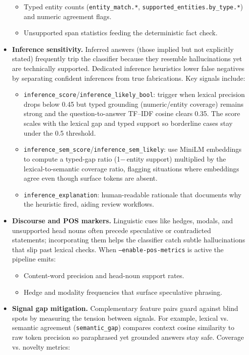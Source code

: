 \documentclass[11pt]{article}
\begin{document}
\begin{itemize}
    \begin{itemize}
      \item Typed entity counts (\texttt{entity\_match.*}, \texttt{supported\_entities.by\_type.*}) and numeric agreement flags.
      \item Unsupported span statistics feeding the deterministic fact check.
    \end{itemize}
  \item \textbf{Inference sensitivity.} Inferred answers (those implied but not explicitly stated) frequently trip the classifier because they resemble hallucinations yet are technically supported. Dedicated inference heuristics lower false negatives by separating confident inferences from true fabrications. Key signals include:
    \begin{itemize}
      \item \texttt{inference\_score}/\texttt{inference\_likely\_bool}: trigger when lexical precision drops below 0.45 but typed grounding (numeric/entity coverage) remains strong and the question-to-answer TF--IDF cosine clears 0.35. The score scales with the lexical gap and typed support so borderline cases stay under the 0.5 threshold.
      \item \texttt{inference\_sem\_score}/\texttt{inference\_sem\_likely}: use MiniLM embeddings to compute a typed-gap ratio (1$-\,$entity support) multiplied by the lexical-to-semantic coverage ratio, flagging situations where embeddings agree even though surface tokens are absent.
      \item \texttt{inference\_explanation}: human-readable rationale that documents why the heuristic fired, aiding review workflows.
    \end{itemize}
  \item \textbf{Discourse and POS markers.} Linguistic cues like hedges, modals, and unsupported head nouns often precede speculative or contradicted statements; incorporating them helps the classifier catch subtle hallucinations that slip past lexical checks. When \texttt{--enable-pos-metrics} is active the pipeline emits:
    \begin{itemize}
      \item Content-word precision and head-noun support rates.
      \item Hedge and modality frequencies that surface speculative phrasing.
    \end{itemize}
  \item \textbf{Signal gap mitigation.} Complementary feature pairs guard against blind spots by measuring the tension between signals. For example, lexical vs. semantic agreement (\texttt{semantic\_gap}) compares context cosine similarity to raw token precision so paraphrased yet grounded answers stay safe. Coverage vs. novelty metrics:

\end{itemize}
\end{document}
